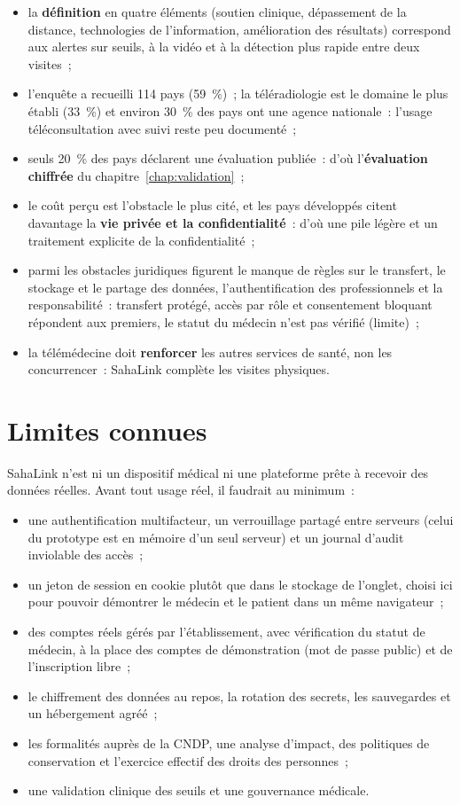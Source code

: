 \begin{itemize}
  \item la \textbf{définition} en quatre éléments (soutien clinique, dépassement de la distance, technologies de l'information, amélioration des résultats) correspond aux alertes sur seuils, à la vidéo et à la détection plus rapide entre deux visites~;
  \item l'enquête a recueilli 114 pays (59~\%)~; la téléradiologie est le domaine le plus établi (33~\%) et environ 30~\% des pays ont une agence nationale~: l'usage téléconsultation avec suivi reste peu documenté~;
  \item seuls 20~\% des pays déclarent une évaluation publiée~: d'où l'\textbf{évaluation chiffrée} du chapitre~\ref{chap:validation}~;
  \item le coût perçu est l'obstacle le plus cité, et les pays développés citent davantage la \textbf{vie privée et la confidentialité}~: d'où une pile légère et un traitement explicite de la confidentialité~;
  \item parmi les obstacles juridiques figurent le manque de règles sur le transfert, le stockage et le partage des données, l'authentification des professionnels et la responsabilité~: transfert protégé, accès par rôle et consentement bloquant répondent aux premiers, le statut du médecin n'est pas vérifié (limite)~;
  \item la télémédecine doit \textbf{renforcer} les autres services de santé, non les concurrencer~: SahaLink complète les visites physiques.
\end{itemize}

\section{Limites connues}

SahaLink n'est ni un dispositif médical ni une plateforme prête à recevoir des données réelles. Avant tout usage réel, il faudrait au minimum~:

\begin{itemize}
  \item une authentification multifacteur, un verrouillage partagé entre serveurs (celui du prototype est en mémoire d'un seul serveur) et un journal d'audit inviolable des accès~;
  \item un jeton de session en cookie  plutôt que dans le stockage de l'onglet, choisi ici pour pouvoir démontrer le médecin et le patient dans un même navigateur~;
  \item des comptes réels gérés par l'établissement, avec vérification du statut de médecin, à la place des comptes de démonstration (mot de passe public) et de l'inscription libre~;
  \item le chiffrement des données au repos, la rotation des secrets, les sauvegardes et un hébergement agréé~;
  \item les formalités auprès de la \ac{CNDP}, une analyse d'impact, des politiques de conservation et l'exercice effectif des droits des personnes~;
  \item une validation clinique des seuils et une gouvernance médicale.
\end{itemize}


